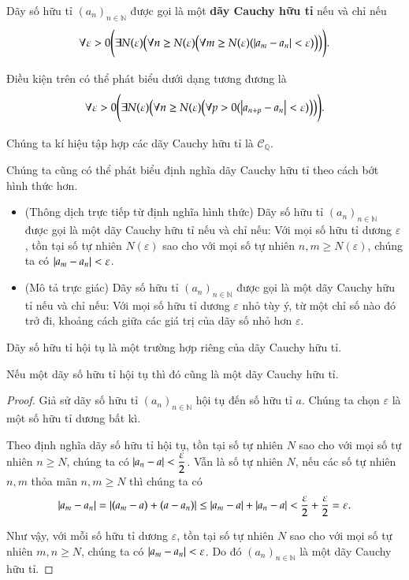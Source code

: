 \begin{definition}
    Dãy số hữu tỉ ${(a_{n})}_{n\in\mathbb{N}}$ được gọi là một \textbf{dãy Cauchy hữu tỉ} nếu và chỉ nếu
    \[
        \forall\varepsilon > 0 \Biggl( \exists N(\varepsilon) \Bigl( \forall n\geq N(\varepsilon) \bigl(\forall m\geq N(\varepsilon) (\left\vert{a_{m} - a_{n}}\right\vert < \varepsilon)\bigr) \Bigr) \Biggr).
    \]

    \noindent Điều kiện trên có thể phát biểu dưới dạng tương đương là
    \[
        \forall\varepsilon > 0 \Biggl( \exists N(\varepsilon) \Bigl( \forall n\geq N(\varepsilon) \bigl(\forall p > 0 (\left\vert{a_{n+p} - a_{n}}\right\vert < \varepsilon)\bigr) \Bigr) \Biggr).
    \]

    \noindent Chúng ta kí hiệu tập hợp các dãy Cauchy hữu tỉ là $\mathscr{C}_{\mathbb{Q}}$.
\end{definition}

Chúng ta cũng có thể phát biểu định nghĩa dãy Cauchy hữu tỉ theo cách bớt hình thức hơn.
\begin{itemize}
    \item (Thông dịch trực tiếp từ định nghĩa hình thức) Dãy số hữu tỉ ${(a_{n})}_{n\in\mathbb{N}}$ được gọi là một dãy Cauchy hữu tỉ nếu và chỉ nếu: Với mọi số hữu tỉ dương $\varepsilon$, tồn tại số tự nhiên $N(\varepsilon)$ sao cho với mọi số tự nhiên $n, m\geq N(\varepsilon)$, chúng ta có $\left\vert{a_{m} - a_{n}}\right\vert < \varepsilon$.
    \item (Mô tả trực giác) Dãy số hữu tỉ ${(a_{n})}_{n\in\mathbb{N}}$ được gọi là một dãy Cauchy hữu tỉ nếu và chỉ nếu: Với mọi số hữu tỉ dương $\varepsilon$ nhỏ tùy ý, từ một chỉ số nào đó trở đi, khoảng cách giữa các giá trị của dãy số nhỏ hơn $\varepsilon$.
\end{itemize}

Dãy số hữu tỉ hội tụ là một trường hợp riêng của dãy Cauchy hữu tỉ.
\begin{theorem}
    Nếu một dãy số hữu tỉ hội tụ thì đó cũng là một dãy Cauchy hữu tỉ.
\end{theorem}

\begin{proof}
    Giả sử dãy số hữu tỉ ${(a_{n})}_{n\in\mathbb{N}}$ hội tụ đến số hữu tỉ $a$. Chúng ta chọn $\varepsilon$ là một số hữu tỉ dương bất kì.

    Theo định nghĩa dãy số hữu tỉ hội tụ, tồn tại số tự nhiên $N$ sao cho với mọi số tự nhiên $n\geq N$, chúng ta có $\left\vert{a_{n} - a}\right\vert < \dfrac{\varepsilon}{2}$. Vẫn là số tự nhiên $N$, nếu các số tự nhiên $n, m$ thỏa mãn $n, m\geq N$ thì chúng ta có
    \[
        \left\vert{a_{m} - a_{n}}\right\vert = \left\vert{(a_{m} - a) + (a - a_{n})}\right\vert \leq \left\vert{a_{m} - a}\right\vert + \left\vert{a_{n} - a}\right\vert < \frac{\varepsilon}{2} + \frac{\varepsilon}{2} = \varepsilon.
    \]

    Như vậy, với mỗi số hữu tỉ dương $\varepsilon$, tồn tại số tự nhiên $N$ sao cho với mọi số tự nhiên $m, n\geq N$, chúng ta có $\left\vert{a_{m} - a_{n}}\right\vert < \varepsilon$. Do đó ${(a_{n})}_{n\in\mathbb{N}}$ là một dãy Cauchy hữu tỉ.
\end{proof}

